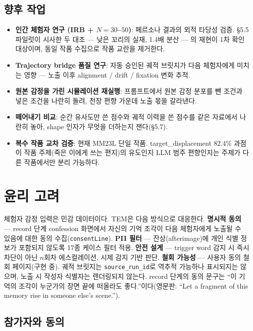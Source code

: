 \documentclass[11pt, a4paper]{article}
\begin{document}
\subsection{향후 작업}
\begin{itemize}
  \item \textbf{인간 체험자 연구 (IRB + $N=30$--$50$)}: 페르소나 결과의 외적 타당성 검증. \S5.5 파일럿이 시사한 두 대조 --- 낮은 꼬리의 실재, 1.4배 분산 --- 의 재현이 1차 확인 대상이며, 동일 작품 수집으로 작품 교란을 제거한다.
  \item \textbf{Trajectory bridge 품질 연구}: 자동 승인된 궤적 브릿지가 다음 체험자에게 미치는 영향 --- 노출 이후 alignment / drift / fixation 변화 추적.
  \item \textbf{원본 감정을 가린 시뮬레이션 재실행}: 프롬프트에서 원본 감정 분포를 뺀 조건과 넣은 조건을 나란히 돌려, 천장 편향 가운데 노출 몫을 갈라낸다.
  \item \textbf{떼어내기 비교}: 순간 유사도만 쓴 점수와 궤적 이력을 쓴 점수를 같은 자료에서 나란히 놓아, shape 인자가 무엇을 더하는지 잰다(\S5.7).
  \item \textbf{복수 작품 교차 검증}: 현재 MM23L 단일 작품. target\_displacement 82.4\% 과점이 작품 주제(죽은 이에게 쓰는 편지)의 유도인지 LLM 범주 편향인지는 주제가 다른 작품에서만 분리 가능하다.
\end{itemize}

\section{윤리 고려}
체험자 감정 입력은 민감 데이터이다. TEM은 다음 방식으로 대응한다. \textbf{명시적 동의} --- record 단계 confession 화면에서 자신의 기억 조각이 다음 체험자에게 노출될 수 있음에 대한 동의 수집(\texttt{consentLine}). \textbf{PII 필터} --- 잔상(afterimage)에 개인 식별 정보가 포함되지 않도록 17종 케이스 필터 적용. \textbf{안전 설계} --- trigger word 감지 시 즉시 차단이 아닌 $n$회차 에스컬레이션, 시제 감지 기반 판단. \textbf{철회 가능성} --- 사용자 동의 철회 페이지(구현 중). 궤적 브릿지는 \texttt{source\_run\_id}로 역추적 가능하나 표시되지는 않으며, 노출 시 작성자 식별자는 렌더링되지 않는다. record 단계의 동의 문구는 ``이 기억의 조각이 누군가의 장면 끝에 떠올라도 좋다.''이다(영문판: ``Let a fragment of this memory rise in someone else's scene.'').

\subsection*{참가자와 동의}
\end{document}
